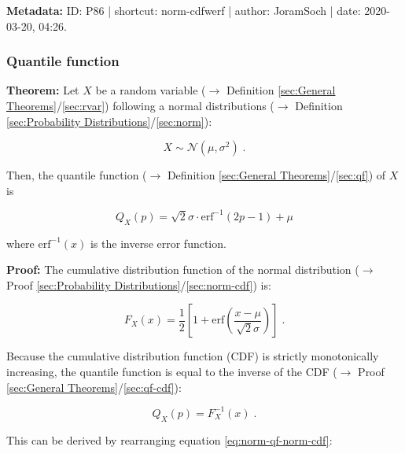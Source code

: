 \documentclass[a4paper,12pt,twoside]{book}
\begin{document}
\vspace{1em}
\textbf{Metadata:} ID: P86 | shortcut: norm-cdfwerf | author: JoramSoch | date: 2020-03-20, 04:26.
\vspace{1em}



\subsubsection[\textbf{Quantile function}]{Quantile function} \label{sec:norm-qf}
\setcounter{equation}{0}

\textbf{Theorem:} Let $X$ be a random variable ($\rightarrow$ Definition \ref{sec:General Theorems}/\ref{sec:rvar}) following a normal distributions ($\rightarrow$ Definition \ref{sec:Probability Distributions}/\ref{sec:norm}):

\begin{equation} \label{eq:norm-qf-norm}
X \sim \mathcal{N}(\mu, \sigma^2) \; .
\end{equation}

Then, the quantile function ($\rightarrow$ Definition \ref{sec:General Theorems}/\ref{sec:qf}) of $X$ is

\begin{equation} \label{eq:norm-qf-norm-qf}
Q_X(p) = \sqrt{2}\sigma \cdot \mathrm{erf}^{-1}(2p-1) + \mu
\end{equation}

where $\mathrm{erf}^{-1}(x)$ is the inverse error function.


\vspace{1em}
\textbf{Proof:} The cumulative distribution function of the normal distribution ($\rightarrow$ Proof \ref{sec:Probability Distributions}/\ref{sec:norm-cdf}) is:

\begin{equation} \label{eq:norm-qf-norm-cdf}
F_X(x) = \frac{1}{2} \left[ 1 + \mathrm{erf}\left( \frac{x-\mu}{\sqrt{2} \sigma} \right) \right] \; .
\end{equation}

Because the cumulative distribution function (CDF) is strictly monotonically increasing, the quantile function is equal to the inverse of the CDF ($\rightarrow$ Proof \ref{sec:General Theorems}/\ref{sec:qf-cdf}):

\begin{equation} \label{eq:norm-qf-norm-qf-s1}
Q_X(p) = F_X^{-1}(x) \; .
\end{equation}

This can be derived by rearranging equation \eqref{eq:norm-qf-norm-cdf}:
\end{document}
